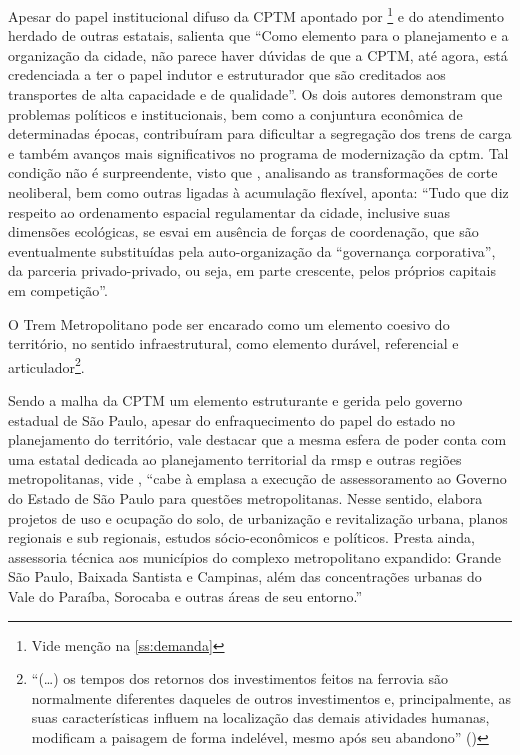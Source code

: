 \documentclass[11pt,fleqn]{book} %
\begin{document}
Apesar do papel institucional difuso da CPTM apontado por \cite{Isoda}\footnote{Vide menção na \autoref{ss:demanda}} e do atendimento herdado de outras estatais, \cite[pág. 97]{Ferreira} salienta que ``Como elemento para o planejamento e a organização da cidade, não parece haver dúvidas de que a CPTM, até agora, está credenciada a ter o papel indutor e estruturador que são creditados aos transportes de alta capacidade e de qualidade''. Os dois autores demonstram que problemas políticos e institucionais, bem como a conjuntura econômica de determinadas épocas, contribuíram para dificultar a segregação dos trens de carga e também avanços mais significativos no programa de modernização da \gls{cptm}. Tal condição não é surpreendente, visto que \cite[pág. 31]{Acselrad}, analisando as transformações de corte neoliberal, bem como outras ligadas à acumulação flexível, aponta: ``Tudo que diz respeito ao ordenamento	espacial regulamentar da cidade, inclusive suas dimensões ecológicas, se esvai em ausência	de forças de coordenação, que são eventualmente substituídas pela auto-organização da “governança corporativa”, da parceria privado-privado, ou seja, em parte crescente, pelos próprios capitais em competição''.

O Trem Metropolitano pode ser encarado como um elemento coesivo do território, no sentido infraestrutural, como elemento durável, referencial e articulador\footnote{``(\dots) os tempos dos retornos dos investimentos feitos na ferrovia são normalmente diferentes daqueles de outros investimentos e, principalmente, as suas características influem na localização das demais atividades humanas, modificam a paisagem de forma indelével, mesmo após seu abandono'' (\cite[pág. 13]{Ferreira})}.

Sendo a malha da CPTM um elemento estruturante e gerida pelo governo estadual de São Paulo, apesar do enfraquecimento do papel do estado no planejamento do território, vale destacar que a mesma esfera de poder conta com uma estatal dedicada ao planejamento territorial da \gls{rmsp} e outras regiões metropolitanas, vide \cite[p. 224]{Stefani}, ``cabe à \gls{emplasa} a execução de assessoramento ao Governo do Estado de São Paulo para questões metropolitanas. Nesse sentido, elabora projetos de uso e ocupação do solo, de urbanização e revitalização urbana, planos regionais e sub regionais, estudos sócio-econômicos e políticos. Presta ainda, assessoria técnica aos municípios do complexo metropolitano expandido: Grande São Paulo, Baixada Santista e Campinas, além das concentrações urbanas do Vale do Paraíba, Sorocaba e outras áreas de seu entorno.''
\end{document}
